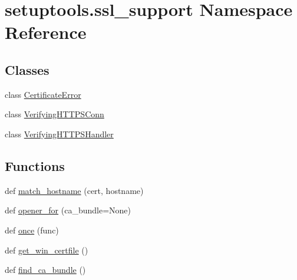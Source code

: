 \hypertarget{namespacesetuptools_1_1ssl__support}{}\section{setuptools.\+ssl\+\_\+support Namespace Reference}
\label{namespacesetuptools_1_1ssl__support}
\subsection*{Classes}
\begin{DoxyCompactItemize}
\item 
class \hyperlink{classsetuptools_1_1ssl__support_1_1_certificate_error}{Certificate\+Error}
\item 
class \hyperlink{classsetuptools_1_1ssl__support_1_1_verifying_h_t_t_p_s_conn}{Verifying\+H\+T\+T\+P\+S\+Conn}
\item 
class \hyperlink{classsetuptools_1_1ssl__support_1_1_verifying_h_t_t_p_s_handler}{Verifying\+H\+T\+T\+P\+S\+Handler}
\end{DoxyCompactItemize}
\subsection*{Functions}
\begin{DoxyCompactItemize}
\item 
def \hyperlink{namespacesetuptools_1_1ssl__support_af946fca9376289edb47b2e1babe9f9ee}{match\+\_\+hostname} (cert, hostname)
\item 
def \hyperlink{namespacesetuptools_1_1ssl__support_ace7164bc765a0d578ae9c82eeb76b13a}{opener\+\_\+for} (ca\+\_\+bundle=None)
\item 
def \hyperlink{namespacesetuptools_1_1ssl__support_af8ea87b3644184df3df0bbda2f796ed5}{once} (func)
\item 
def \hyperlink{namespacesetuptools_1_1ssl__support_a057bf5d0a699f8fba4f40ac7c339185d}{get\+\_\+win\+\_\+certfile} ()
\item 
def \hyperlink{namespacesetuptools_1_1ssl__support_a52d0214adb152f4c38aebc413e404278}{find\+\_\+ca\+\_\+bundle} ()
\end{DoxyCompactItemize}
